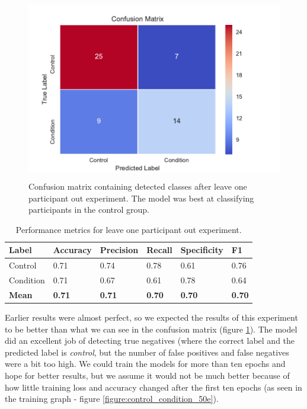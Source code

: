 \begin{figure}[h]
\begin{center}
      \includegraphics[height=8cm]{img/control_condition/leave_one_out.pdf}
      \caption{Confusion matrix containing detected classes after leave one participant out experiment. The model was best at classifying participants in the control group.}
      \label{figure:control_condition_conf_loo}
\end{center}
\end{figure}

\begin{table}[h]
\begin{center}
      \begin{tabular}{|l|l|l|l|l|l|}
            \hline
            \bfseries Label & \bfseries Accuracy & \bfseries Precision & \bfseries Recall & \bfseries Specificity & \bfseries F1 \\\hline
            Control & 0.71 & 0.74 & 0.78 & 0.61 & 0.76 \\\hline
            Condition & 0.71 & 0.67 & 0.61 & 0.78 & 0.64 \\\hline
            \bfseries Mean & \bfseries 0.71 & \bfseries 0.71 & \bfseries 0.70 & \bfseries 0.70 & \bfseries 0.70 \\\hline
      \end{tabular}
      \caption{Performance metrics for leave one participant out experiment.}
      \label{table:control_condition_performance_loo}
\end{center}
\end{table}

Earlier results were almost perfect, so we expected the results of this experiment to be better than what we can see in the confusion matrix (figure \ref{figure:control_condition_conf_loo}). The model did an excellent job of detecting true negatives (where the correct label and the predicted label is \textit{control}, but the number of false positives and false negatives were a bit too high. We could train the models for more than ten epochs and hope for better results, but we assume it would not be much better because of how little training loss and accuracy changed after the first ten epochs (as seen in the training graph - figure \ref{figure:control_condition_50e}). 

